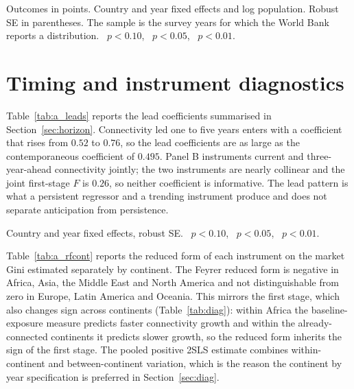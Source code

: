 \begin{table}[H]\centering\caption{Survey-based inequality measures (World Bank Poverty and Inequality Platform).}\label{tab:a_altdv}
\begin{threeparttable}\small
\begin{tablenotes}\footnotesize\item Outcomes in points. Country and year fixed effects and log population. Robust SE in parentheses. The sample is the survey years for which the World Bank reports a distribution. \sym{*}~$p<0.10$, \sym{**}~$p<0.05$, \sym{***}~$p<0.01$.\end{tablenotes}\end{threeparttable}\end{table}

\section{Timing and instrument diagnostics}
\label{app:timing}
Table~\ref{tab:a_leads} reports the lead coefficients summarised in Section~\ref{sec:horizon}. Connectivity led one to five years enters with a coefficient that rises from $0.52$ to $0.76$, so the lead coefficients are as large as the contemporaneous coefficient of $0.495$. Panel B instruments current and three-year-ahead connectivity jointly; the two instruments are nearly collinear and the joint first-stage $F$ is $0.26$, so neither coefficient is informative. The lead pattern is what a persistent regressor and a trending instrument produce and does not separate anticipation from persistence.

\begin{table}[H]\centering\caption{Leads of connectivity.}\label{tab:a_leads}
\begin{threeparttable}\small
\begin{tablenotes}\footnotesize\item Country and year fixed effects, robust SE. \sym{*}~$p<0.10$, \sym{**}~$p<0.05$, \sym{***}~$p<0.01$.\end{tablenotes}\end{threeparttable}\end{table}

Table~\ref{tab:a_rfcont} reports the reduced form of each instrument on the market Gini estimated separately by continent. The Feyrer reduced form is negative in Africa, Asia, the Middle East and North America and not distinguishable from zero in Europe, Latin America and Oceania. This mirrors the first stage, which also changes sign across continents (Table~\ref{tab:diag}): within Africa the baseline-exposure measure predicts faster connectivity growth and within the already-connected continents it predicts slower growth, so the reduced form inherits the sign of the first stage. The pooled positive 2SLS estimate combines within-continent and between-continent variation, which is the reason the continent by year specification is preferred in Section~\ref{sec:diag}.

